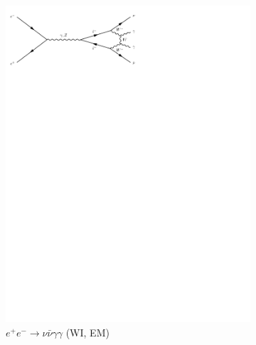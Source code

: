 \begin{figure}[h]
\begin{subfigure}[b]{0.3\textwidth}
    \includegraphics[trim={0.5cm 22cm 10cm 0cm},width=\textwidth]{../Diagrams/D13.pdf}
    \caption{$e^+e^- \rightarrow \nu\bar{\nu}\gamma\gamma$ (WI, EM)}
    \label{fey:13}
  \end{subfigure}%
  ~
  \begin{subfigure}[b]{0.3\textwidth}

\end{subfigure}
\end{figure}
